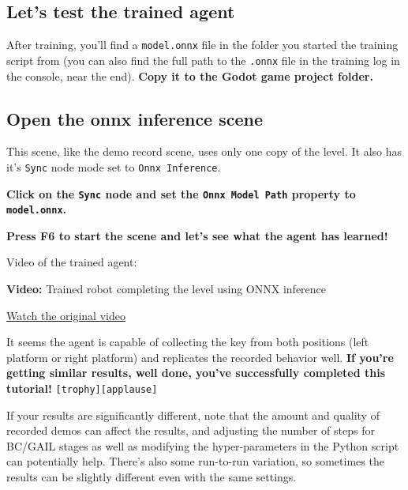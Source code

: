 \documentclass[11pt,a4paper]{article}
\begin{document}
\subsection{Let's test the trained agent}\label{lets-test-the-trained-agent}

After training, you'll find a \passthrough{\lstinline!model.onnx!} file in the folder you started the training script from (you can also find the full path to the \passthrough{\lstinline!.onnx!} file in the training log in the console, near the end). \textbf{Copy it to the Godot game project folder.}

\subsection{Open the onnx inference scene}\label{open-the-onnx-inference-scene}

This scene, like the demo record scene, uses only one copy of the level. It also has it's \passthrough{\lstinline!Sync!} node mode set to \passthrough{\lstinline!Onnx Inference!}.

\textbf{Click on the \passthrough{\lstinline!Sync!} node and set the \passthrough{\lstinline!Onnx Model Path!} property to \passthrough{\lstinline!model.onnx!}.}


\textbf{Press F6 to start the scene and let's see what the agent has learned!}

Video of the trained agent:

\begin{coursenote}\textbf{Video:} Trained robot completing the level using ONNX inference\par\small\href{https://huggingface.co/datasets/huggingface-deep-rl-course/course-images/resolve/main/en/unit13/onnx_inference_test.mp4}{Watch the original video}\end{coursenote}

It seems the agent is capable of collecting the key from both positions (left platform or right platform) and replicates the recorded behavior well. \textbf{If you're getting similar results, well done, you've successfully completed this tutorial!} \texttt{[trophy]}\texttt{[applause]}

If your results are significantly different, note that the amount and quality of recorded demos can affect the results, and adjusting the number of steps for BC/GAIL stages as well as modifying the hyper-parameters in the Python script can potentially help. There's also some run-to-run variation, so sometimes the results can be slightly different even with the same settings.
\end{document}
